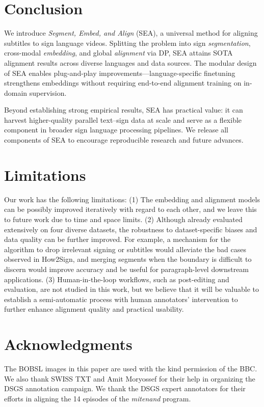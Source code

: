 \documentclass[11pt]{article}
\begin{document}
\section{Conclusion}

We introduce \textit{Segment, Embed, and Align} (SEA), a universal method for aligning subtitles to sign language videos. 
Splitting the problem into sign \emph{segmentation}, cross-modal \emph{embedding}, and global \emph{alignment} via DP, SEA attains SOTA alignment results across diverse languages and data sources. 
The modular design of SEA enables plug-and-play improvements—language-specific finetuning strengthens embeddings without requiring end-to-end alignment training on in-domain supervision.

Beyond establishing strong empirical results, SEA has practical value: it can harvest higher-quality parallel text–sign data at scale and serve as a flexible component in broader sign language processing pipelines. 
We release all components of SEA to encourage reproducible research and future advances.

\section*{Limitations}
\label{sec:limit}

Our work has the following limitations:
(1) The embedding and alignment models can be possibly improved iteratively with regard to each other, and we leave this to future work due to time and space limits.
(2) Although already evaluated extensively on four diverse datasets, the robustness to dataset-specific biases and data quality can be further improved. For example, a mechanism for the algorithm to drop irrelevant signing or subtitles would alleviate the bad cases observed in How2Sign, and merging segments when the boundary is difficult to discern would improve accuracy and be useful for paragraph-level downstream applications.
(3) Human-in-the-loop workflows, such as post-editing and evaluation, are not studied in this work, but we believe that it will be valuable to establish a semi-automatic process with human annotators' intervention to further enhance alignment quality and practical usability.





\section*{Acknowledgments}
The BOBSL images in this paper are used with the kind permission of the BBC.
We also thank SWISS TXT and Amit Moryossef for their help in organizing the DSGS annotation campaign.
We thank the DSGS expert annotators for their efforts in aligning the 14 episodes of the \textit{mitenand} program.
\end{document}
